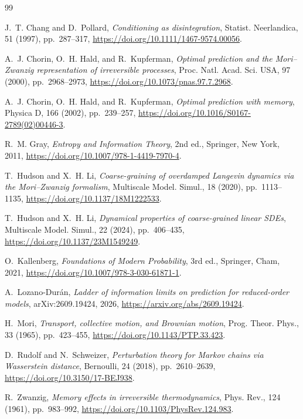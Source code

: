 \documentclass[final,hidelinks]{siamart251216}
\begin{document}
\newpage
\begin{thebibliography}{99}

{\sc J.~T. Chang and D.~Pollard},
{\em Conditioning as disintegration},
Statist. Neerlandica, 51 (1997), pp.~287--317,
\url{https://doi.org/10.1111/1467-9574.00056}.

{\sc A.~J. Chorin, O.~H. Hald, and R.~Kupferman},
{\em Optimal prediction and the Mori--Zwanzig representation of irreversible processes},
Proc. Natl. Acad. Sci. USA, 97 (2000), pp.~2968--2973,
\url{https://doi.org/10.1073/pnas.97.7.2968}.

{\sc A.~J. Chorin, O.~H. Hald, and R.~Kupferman},
{\em Optimal prediction with memory},
Physica D, 166 (2002), pp.~239--257,
\url{https://doi.org/10.1016/S0167-2789(02)00446-3}.

{\sc R.~M. Gray},
{\em Entropy and Information Theory}, 2nd ed.,
Springer, New York, 2011,
\url{https://doi.org/10.1007/978-1-4419-7970-4}.

{\sc T.~Hudson and X.~H. Li},
{\em Coarse-graining of overdamped Langevin dynamics via the Mori--Zwanzig formalism},
Multiscale Model. Simul., 18 (2020), pp.~1113--1135,
\url{https://doi.org/10.1137/18M1222533}.

{\sc T.~Hudson and X.~H. Li},
{\em Dynamical properties of coarse-grained linear SDEs},
Multiscale Model. Simul., 22 (2024), pp.~406--435,
\url{https://doi.org/10.1137/23M1549249}.

{\sc O.~Kallenberg},
{\em Foundations of Modern Probability}, 3rd ed.,
Springer, Cham, 2021,
\url{https://doi.org/10.1007/978-3-030-61871-1}.

{\sc A.~Lozano-Dur\'an},
{\em Ladder of information limits on prediction for reduced-order models},
arXiv:2609.19424, 2026,
\url{https://arxiv.org/abs/2609.19424}.

{\sc H.~Mori},
{\em Transport, collective motion, and Brownian motion},
Prog. Theor. Phys., 33 (1965), pp.~423--455,
\url{https://doi.org/10.1143/PTP.33.423}.

{\sc D.~Rudolf and N.~Schweizer},
{\em Perturbation theory for Markov chains via Wasserstein distance},
Bernoulli, 24 (2018), pp.~2610--2639,
\url{https://doi.org/10.3150/17-BEJ938}.

{\sc R.~Zwanzig},
{\em Memory effects in irreversible thermodynamics},
Phys. Rev., 124 (1961), pp.~983--992,
\url{https://doi.org/10.1103/PhysRev.124.983}.


\end{thebibliography}
\end{document}
